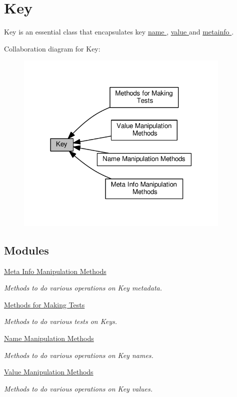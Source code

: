 \hypertarget{group__key}{}\section{Key}
\label{group__key}


Key is an essential class that encapsulates key \hyperlink{group__keyname}{name }, \hyperlink{group__keyvalue}{value } and \hyperlink{group__keymeta}{metainfo }.  


Collaboration diagram for Key\+:
\nopagebreak
\begin{figure}[H]
\begin{center}
\leavevmode
\includegraphics[width=291pt]{group__key}
\end{center}
\end{figure}
\subsection*{Modules}
\begin{DoxyCompactItemize}
\item 
\hyperlink{group__keymeta}{Meta Info Manipulation Methods}
\begin{DoxyCompactList}\small\item\em Methods to do various operations on Key metadata. \end{DoxyCompactList}\item 
\hyperlink{group__keytest}{Methods for Making Tests}
\begin{DoxyCompactList}\small\item\em Methods to do various tests on Keys. \end{DoxyCompactList}\item 
\hyperlink{group__keyname}{Name Manipulation Methods}
\begin{DoxyCompactList}\small\item\em Methods to do various operations on Key names. \end{DoxyCompactList}\item 
\hyperlink{group__keyvalue}{Value Manipulation Methods}
\begin{DoxyCompactList}\small\item\em Methods to do various operations on Key values. \end{DoxyCompactList}\end{DoxyCompactItemize}
